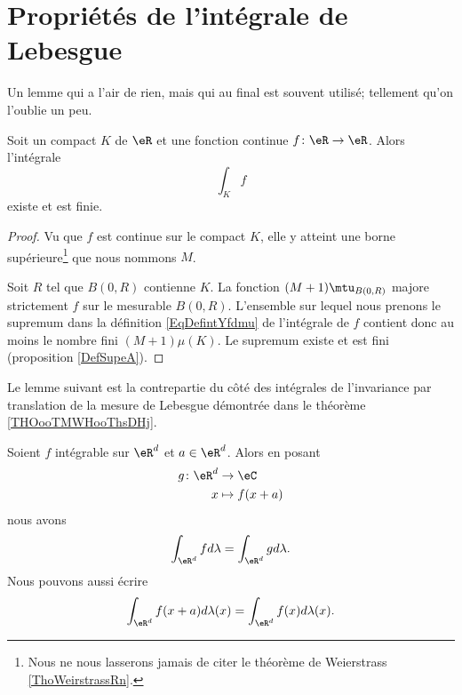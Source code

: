 
\section{Propriétés de l'intégrale de Lebesgue}

Un lemme qui a l'air de rien, mais qui au final est souvent utilisé; tellement qu'on l'oublie un peu.
\begin{lemma}       \label{LEMooWKSWooPptdEm}
	Soit un compact \( K\) de \( \eR\) et une fonction continue \( f\colon \eR\to \eR\). Alors l'intégrale
	\begin{equation}
		\int_Kf
	\end{equation}
	existe et est finie.
\end{lemma}

\begin{proof}
	Vu que \( f\) est continue sur le compact \( K\), elle y atteint une borne supérieure\footnote{Nous ne nous lasserons jamais de citer le théorème de Weierstrass \ref{ThoWeirstrassRn}.} que nous nommons \( M\).

	Soit \( R\) tel que \( B(0,R)\) contienne \( K\). La fonction \( (M+1)\mtu_{B(0,R)}\) majore strictement \( f\) sur le mesurable \( B(0,R)\). L'ensemble sur lequel nous prenons le supremum dans la définition \eqref{EqDefintYfdmu} de l'intégrale de \( f\) contient donc au moins le nombre fini \( (M+1)\mu(K)\). Le supremum existe et est fini (proposition \ref{DefSupeA}).
\end{proof}

Le lemme suivant est la contrepartie du côté des intégrales de l'invariance par translation de la mesure de Lebesgue démontrée dans le théorème \ref{THOooTMWHooThsDHj}.
\begin{lemma}       \label{LEMooGKOGooPLYaUO}
	Soient \( f\) intégrable sur \( \eR^d\) et \( a\in \eR^d\). Alors en posant
	\begin{equation}
		\begin{aligned}
			g\colon \eR^d & \to \eC        \\
			x             & \mapsto f(x+a)
		\end{aligned}
	\end{equation}
	nous avons
	\begin{equation}
		\int_{\eR^d}fd\lambda = \int_{\eR^d}gd\lambda.
	\end{equation}
	Nous pouvons aussi écrire
	\begin{equation}
		\int_{\eR^d}f(x+a)d\lambda(x)=\int_{\eR^d}f(x)d\lambda(x).
	\end{equation}
\end{lemma}

